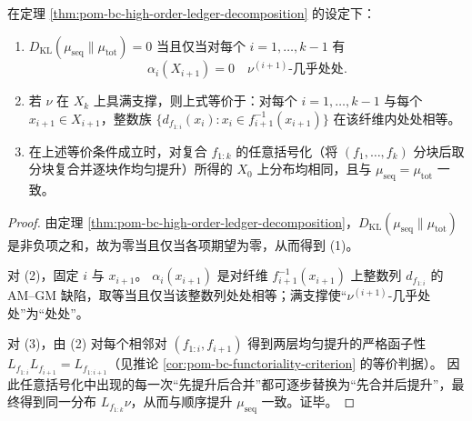 \begin{corollary}[零缺陷的层级刚性与括号化不变性]\label{cor:pom-bc-zero-defect-rigidity-parenthesization}
在定理 \ref{thm:pom-bc-high-order-ledger-decomposition} 的设定下：
\begin{enumerate}
  \item \(D_{\mathrm{KL}}(\mu_{\mathrm{seq}}\|\mu_{\mathrm{tot}})=0\) 当且仅当对每个 \(i=1,\dots,k-1\) 有
  \[
  \alpha_i(X_{i+1})=0\quad \nu^{(i+1)}\text{-几乎处处}.
  \]
  \item 若 \(\nu\) 在 \(X_k\) 上具满支撑，则上式等价于：对每个 \(i=1,\dots,k-1\) 与每个 \(x_{i+1}\in X_{i+1}\)，整数族
  \(
  \{d_{f_{1:i}}(x_i):x_i\in f_{i+1}^{-1}(x_{i+1})\}
  \)
  在该纤维内处处相等。
  \item 在上述等价条件成立时，对复合 \(f_{1:k}\) 的任意括号化（将 \((f_1,\dots,f_k)\) 分块后取分块复合并逐块作均匀提升）所得的 \(X_0\) 上分布均相同，且与 \(\mu_{\mathrm{seq}}=\mu_{\mathrm{tot}}\) 一致。
\end{enumerate}
\end{corollary}
\begin{proof}
由定理 \ref{thm:pom-bc-high-order-ledger-decomposition}，\(D_{\mathrm{KL}}(\mu_{\mathrm{seq}}\|\mu_{\mathrm{tot}})\) 是非负项之和，故为零当且仅当各项期望为零，从而得到 (1)。
\par
对 (2)，固定 \(i\) 与 \(x_{i+1}\)。
\(\alpha_i(x_{i+1})\) 是对纤维 \(f_{i+1}^{-1}(x_{i+1})\) 上整数列 \(d_{f_{1:i}}\) 的 AM--GM 缺陷，取等当且仅当该整数列处处相等；满支撑使“\(\nu^{(i+1)}\)-几乎处处”为“处处”。
\par
对 (3)，由 (2) 对每个相邻对 \((f_{1:i},f_{i+1})\) 得到两层均匀提升的严格函子性 \(L_{f_{1:i}}L_{f_{i+1}}=L_{f_{1:i+1}}\)（见推论 \ref{cor:pom-bc-functoriality-criterion} 的等价判据）。
因此任意括号化中出现的每一次“先提升后合并”都可逐步替换为“先合并后提升”，最终得到同一分布 \(L_{f_{1:k}}\nu\)，从而与顺序提升 \(\mu_{\mathrm{seq}}\) 一致。证毕。
\end{proof}

